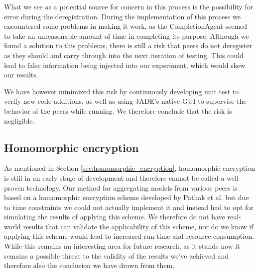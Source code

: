 What we see as a potential source for concern in this process is the possibility for error during the deregistration. During the implementation of this process we encountered some problems in making it work, as the CompletionAgent seemed to take an unreasonable amount of time in completing its purpose. Although we found a solution to this problems, there is still a risk that peers do not deregister as they should and carry through into the next iteration of testing. This could lead to false information being injected into our experiment, which would skew our results.  

We have however minimized this risk by continuously developing unit test to verify new code additions, as well as using JADE's native GUI to supervise the behavior of the peers while running. We therefore conclude that the risk is negligible.


\subsection{Homomorphic encryption}
As mentioned in Section \ref{sec:homomorphic_encryption}, homomorphic encryption is still in an early stage of development and therefore cannot be called a well-proven technology. Our method for aggregating models from various peers is based on a homomorphic encryption scheme developed by Pathak et al. but due to time constraints we could not actually implement it and instead had to opt for simulating the results of applying this scheme. We therefore do not have real-world results that can validate the applicability of this scheme, nor do we know if applying this scheme would lead to increased run-time and resource consumption. While this remains an interesting area for future research, as it stands now it remains a possible threat to the validity of the results we've achieved and therefore also the conclusion we have drawn from them.  

